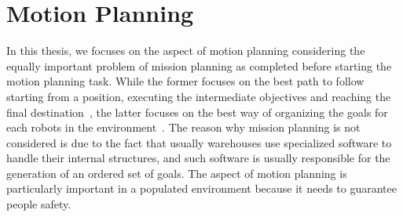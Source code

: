 \chapter{Motion Planning}
\label{ch:motionPlanning}
In this thesis, we focuses on the aspect of motion planning considering the
equally important problem of mission planning as completed before starting the
motion planning task. While the former focuses on the best path to follow
starting from a position, executing the intermediate objectives and reaching
the final destination~\cite{motionplanning}, the latter focuses on the best way
of organizing the goals for each robots in the
environment~\cite{missionplanning}. The reason why mission planning is not
considered is due to the fact that usually warehouses use specialized software
to handle their internal structures, and such software is usually responsible
for the generation of an ordered set of goals. The aspect of motion planning is
particularly important in a populated environment because it needs to guarantee
people safety. 
%
%
%
